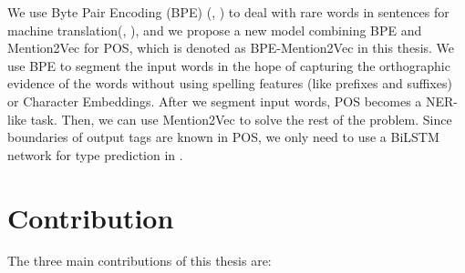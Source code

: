 We use Byte Pair Encoding (BPE) (\citeauthor{gage1994new}, \citeyear{gage1994new}) to deal with rare words in sentences for machine translation(\citeauthor{sennrich2015neural}, \citeyear{sennrich2015neural}), and we propose a new model combining BPE and Mention2Vec for POS, which is denoted as BPE-Mention2Vec in this thesis. We use BPE to segment the input words in the hope of capturing the orthographic evidence of the words without using spelling features (like prefixes and suffixes) or Character Embeddings. After we segment input words, POS becomes a NER-like task. Then, we can use Mention2Vec to solve the rest of the problem. Since boundaries of output tags are known in POS, we only need to use a BiLSTM network for type prediction in \mb.

\section{Contribution}
The three main contributions of this thesis are:

